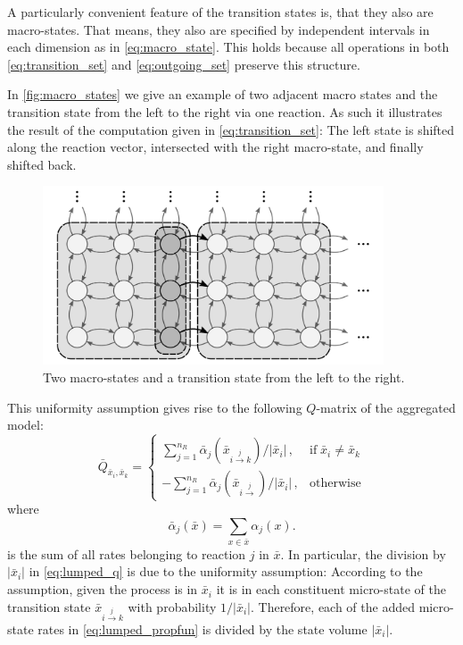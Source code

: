 A particularly convenient feature of the transition states is, that they also are macro-states.
That means, they also are specified by independent intervals in each dimension as in \eqref{eq:macro_state}.
This holds because all operations in both \eqref{eq:transition_set} and \eqref{eq:outgoing_set} preserve this structure.

\begin{example}
In \autoref{fig:macro_states}
we give an example of two adjacent macro states and the
transition state from the left to the right via one reaction.
As such it illustrates the result of the computation given in \eqref{eq:transition_set}:
The left state is shifted along the reaction vector, intersected with the right macro-state, and finally shifted back.
\begin{figure}[htb]
	\centering
	\includegraphics[width=0.9\textwidth]{gfx/macro_states.pdf}
	\caption[Macro-state transition]{\label{fig:macro_states}Two macro-states and a transition state from the left to the right.}
\end{figure}
\end{example}

This uniformity assumption gives rise to the following $Q$-matrix of the aggregated model:
\begin{equation}\label{eq:lumped_q}
    \bar{Q}_{ \bar{x}_i,  \bar{x}_k} = \begin{cases}
        \sum_{j=1}^{n_R}{\bar\alpha}_j\left(\bar{x}_{i\xrightarrow{j}k}\right)/\left|\bar{x}_i\right|\,,&\text{if}\; \bar{x}_i\neq \bar{x}_k\\[1ex]
        -\sum_{j=1}^{n_R}{\bar\alpha}_j\left(\bar{x}_{i\xrightarrow{j}}\right)/{\left|\bar{x}_i\right|}\,, &\text{otherwise}
    \end{cases}
\end{equation}
where 
\begin{equation}\label{eq:lumped_propfun}
    \bar{\alpha}_j({\bar{x}}) = \sum_{x\in \bar{x}} \alpha_j(x).
\end{equation}
is the sum of all rates belonging to reaction $j$ in $\bar{x}$.
In particular, the division by $\left|\bar{x}_i\right|$ in \eqref{eq:lumped_q} is due to the uniformity assumption: According to the assumption, given the process is in $\bar{x}_i$ it is in
each constituent micro-state of the transition state $\bar{x}_{i\xrightarrow{j} k}$ with probability $1/{\left|\bar{x}_i\right|}$.
Therefore, each of the added micro-state rates in \eqref{eq:lumped_propfun} is divided
by the state volume $\left|\bar{x}_i\right|$.


